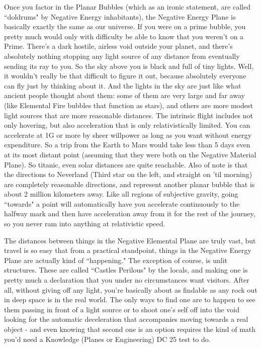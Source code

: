 Once you factor in the Planar Bubbles (which as an ironic statement, are called ``doldrums" by Negative Energy inhabitants), the Negative Energy Plane is basically exactly the same as our universe. If you were on a prime bubble, you pretty much would only with difficulty be able to know that you weren't on a Prime. There's a dark hostile, airless void outside your planet, and there's absolutely nothing stopping any light source of any distance from eventually sending its ray to you. So the sky above you is black and full of tiny lights. Well, it wouldn't really be that difficult to figure it out, because absolutely everyone can fly just by thinking about it. And the lights in the sky are just like what ancient people thought about them: some of them are very large and far away (like Elemental Fire bubbles that function as stars), and others are more modest light sources that are more reasonable distances. The intrinsic flight includes not only hovering, but also acceleration that is only relativistically limited. You can accelerate at 1G or more by sheer willpower as long as you want without energy expenditure. So a trip from the Earth to Mars would take less than 5 days even at its most distant point (assuming that they were both on the Negative Material Plane). So titanic, even solar distances are quite reachable. Also of note is that the directions to Neverland (Third star on the left, and straight on 'til morning) are completely reasonable directions, and represent another planar bubble that is about 2 million kilometers away. Like all regions of subjective gravity, going ``towards" a point will automatically have you accelerate continuously to the halfway mark and then have acceleration away from it for the rest of the journey, so you never ram into anything at relativistic speed.

The distances between things in the Negative Elemental Plane are truly vast, but travel is so easy that from a practical standpoint, things in the Negative Energy Plane are actually kind of ``happening." The exception of course, is unlit structures. These are called ``Castles Perilous" by the locals, and making one is pretty much a declaration that you under no circumstances want visitors. After all, without giving off any light, you're basically about as findable as any rock out in deep space is in the real world. The only ways to find one are to happen to see them passing in front of a light source or to shoot one's self off into the void looking for the automatic deceleration that accompanies moving towards a real object - and even knowing that second one is an option requires the kind of math you'd need a Knowledge (Planes or Engineering) DC 25 test to do.

